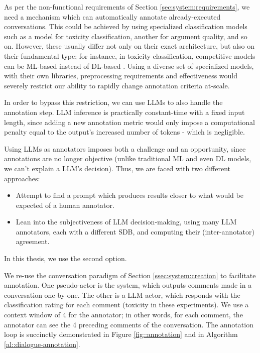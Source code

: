As per the non-functional requirements of Section \ref{sec:system:requirements}, we need a mechanism which can automatically annotate already-executed conversations. This could be achieved by using specialized classification models such as a model for toxicity classification, another for argument quality, and so on. However, these usually differ not only on their exact architecture, but also on their fundamental type; for instance, in toxicity classification, competitive models can be \ac{ML}-based instead of \ac{DL}-based \cite{anjum2024hate}. Using a diverse set of specialized models, with their own libraries, preprocessing requirements and effectiveness would severely restrict our ability to rapidly change annotation criteria at-scale. 

In order to bypass this restriction, we can use LLMs to also handle the annotation step. LLM inference is practically constant-time with a fixed input length, since adding a new annotation metric would only impose a computational penalty equal to the output's increased number of tokens - which is negligible. 

Using LLMs as annotators imposes both a challenge and an opportunity, since annotations are no longer objective (unlike traditional \ac{ML} and even \ac{DL} models, we can't explain a LLM's decision). Thus, we are faced with two different approaches:

\begin{itemize}
	\item Attempt to find a prompt which produces results closer to what would be expected of a human annotator.
	\item Lean into the subjectiveness of LLM decision-making, using many LLM annotators, each with a different \ac{SDB}, and computing their (inter-annotator) agreement.
\end{itemize}

In this thesis, we use the second option.

We re-use the conversation paradigm of Section \ref{ssec:system:creation} to facilitate annotation. One pseudo-actor is the system, which outputs comments made in a conversation one-by-one. The other is a LLM actor, which responds with the classification rating for each comment (toxicity in these experiments).  We use a context window of 4 for the annotator; in other words, for each comment, the annotator can see the 4 preceding comments of the conversation. The annotation loop is succinctly demonstrated in Figure \ref{fig::annotation} and in Algorithm \ref{al::dialogue-annotation}.

